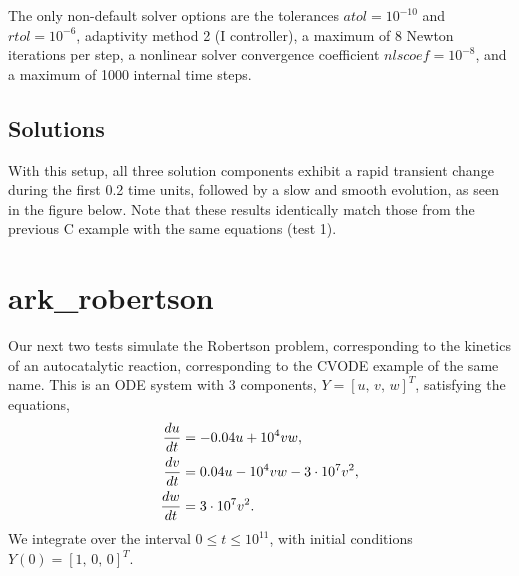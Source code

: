 \documentclass[letterpaper,10pt,english]{sphinxmanual}
\begin{document}
The only non-default solver options are the tolerances
$atol=10^{-10}$ and $rtol=10^{-6}$, adaptivity method 2 (I
controller), a maximum of 8 Newton iterations per step, a nonlinear
solver convergence coefficient $nlscoef=10^{-8}$, and a maximum
of 1000 internal time steps.


\section{Solutions}
\label{ark_bruss:solutions}
With this setup, all three solution components exhibit a rapid
transient change during the first 0.2 time units, followed by a slow
and smooth evolution, as seen in the figure below.  Note that these
results identically match those from the previous C example with the
same equations (test 1).
\begin{figure}[htbp]
\centering

\end{figure}


\chapter{ark\_robertson}
\label{ark_robertson:ark-robertson}\label{ark_robertson::doc}\label{ark_robertson:id1}
Our next two tests simulate the Robertson problem, corresponding to the
kinetics of an autocatalytic reaction, corresponding to the CVODE
example of the same name.  This is an ODE system with 3
components, $Y = [u,\, v,\, w]^T$, satisfying the equations,
\begin{gather}
\begin{split}\frac{du}{dt} &= -0.04 u + 10^4 v w, \\
\frac{dv}{dt} &= 0.04 u - 10^4 v w - 3\cdot10^7 v^2, \\
\frac{dw}{dt} &= 3\cdot10^7 v^2.\end{split}\notag
\end{gather}
We integrate over the interval $0\le t\le 10^{11}$, with initial
conditions  $Y(0) = [1,\, 0,\, 0]^T$.
\end{document}
